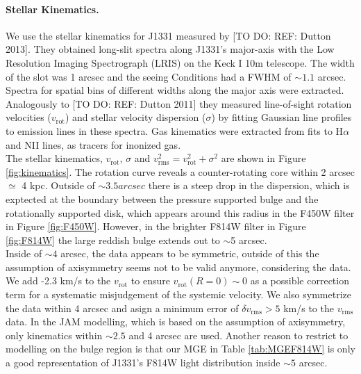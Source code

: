 \paragraph{Stellar Kinematics.} We use the stellar kinematics for J1331 measured by [TO DO: REF: Dutton 2013]. They obtained long-slit spectra along J1331's major-axis with the Low Resolution Imaging Spectrograph (LRIS) on the Keck I 10m telescope. The width of the slot was 1 arcsec and the seeing Conditions had a FWHM of $\sim 1.1$ arcsec. Spectra for spatial bins of different widths along the major axis were extracted. Analogously to [TO DO: REF: Dutton 2011] they measured line-of-sight rotation velocities ($v_\text{rot}$) and stellar velocity dispersion ($\sigma$) by fitting Gaussian line profiles to emission lines in these spectra. Gas kinematics were extracted from fits to H$\alpha$ and NII lines, as tracers for inonized gas.
\\The stellar kinematics, $v_\text{rot}$, $\sigma$ and $v_\text{rms}^2=v_\text{rot}^2 + \sigma^2$ are shown in Figure \ref{fig:kinematics}. The rotation curve reveals a counter-rotating core within 2 arcsec $\simeq$ 4 kpc. Outside of $\sim 3.5 arcsec$ there is a steep drop in the dispersion, which is exptected at the boundary between the pressure supported bulge and the rotationally supported disk, which appears around this radius in the F450W filter in Figure \ref{fig:F450W}. However, in the brighter F814W filter in Figure \ref{fig:F814W}  the large reddish bulge extends out to $\sim$5 arcsec. 
\\Inside of $\sim 4$ arcsec, the data appears to be symmetric, outside of this the assumption of axisymmetry seems not to be valid anymore, considering the data. We add -2.3 km/s to the $v_\text{rot}$ to ensure $v_\text{rot}(R=0) \sim 0$ as a possible correction term for a systematic misjudgement of the systemic velocity. We also symmetrize the data within 4 arcsec and asign a minimum error of $\delta v_\text{rms} > 5$ km/s to the $v_\text{rms}$ data. In the JAM modelling, which is based on the assumption of axisymmetry, only kinematics within $\sim 2.5$ and 4 arcsec are used. Another reason to restrict to modelling on the bulge region is that our MGE in Table \ref{tab:MGEF814W} is only a good representation of J1331's F814W light distribution inside $\sim 5$ arcsec.